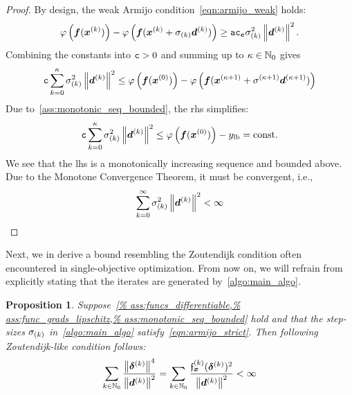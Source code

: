 \documentclass{article}
\theoremstyle{plain}
\newtheorem{proposition}[theorem]{Proposition}
\theoremstyle{definition}
\begin{document}
\begin{proof}
	By design, the weak Armijo condition~\eqref{eqn:armijo_weak} holds:
	$$
	\varphi\left(
		\bm{f}(\bm{x}^{(k)})
	\right)
	-
	\varphi\left(
		\bm{f}(\bm{x}^{(k)} + \sigma_{(k)} \bm{d}^{(k)})
	\right)
	\ge 
	\mathtt{a} \mathtt{c}_{\bm{e}} \sigma_{(k)}^2 \left\|\bm{d}^{(k)}\right\|^2 
	.
	$$
	Combining the constants into $\mathtt c >0$ and summing up to $\kappa \in \mathbb N_0$ gives 
	$$
	\mathtt c
	\sum_{k=0}^\kappa
	\sigma_{(k)}^2 \left\|\bm{d}^{(k)}\right\|^2
	\leq
	\varphi\left(
		\bm{f}(\bm{x}^{(0)})
	\right)
	-
	\varphi\left(
		\bm{f}(\bm{x}^{(\kappa + 1)} + \sigma^{(\kappa + 1)} \bm{d}^{(\kappa + 1)})
	\right)
	$$
	Due to~\cref{ass:monotonic_seq_bounded},
	the \ac{rhs} simplifies:
	$$
	\mathtt c
	\sum_{k=0}^\kappa
	\sigma_{(k)}^2 \left\|\bm{d}^{(k)}\right\|^2
	\leq
	\varphi\left(
		\bm{f}(\bm{x}^{(0)})
	\right)
	-
	{y}_{\mathrm{lb}}
	=
	\text{const}.
	$$
	We see that the \ac{lhs} is a monotonically increasing sequence and bounded above.
	Due to the Monotone Convergence Theorem, it must be convergent, i.e.,
	$$\sum_{k=0}^\infty \sigma_{(k)}^2 \left\|\bm{d}^{(k)}\right\|^2 < \infty $$
\end{proof}

Next, we in derive a bound resembling the Zoutendijk condition often encountered 
in single-objective optimization.
From now on, we will refrain from explicitly stating that the iterates are generated 
by~\cref{algo:main_algo}.
\begin{proposition}%
	\label{thm:armijoZoutendijk}
	Suppose~\cref{%
	ass:funcs_differentiable,%
	ass:func_grads_lipschitz,%
	ass:monotonic_seq_bounded}
	hold and that the step-sizes $\sigma_{(k)}$ in~\cref{algo:main_algo}
	satisfy~\cref{eqn:armijo_strict}.  
	Then following Zoutendijk-like condition follows:
	\begin{equation}
		\sum_{k \in \mathbb N_0}
		\frac{
			\left\|\bm{\delta}^{(k)}\right\|^4
		}{
			\left\|\bm{d}^{(k)}\right\|^2
		}
		=
		\sum_{k \in \mathbb N_0}
		\frac{
			\mathfrak{f}_{\bm{x}}^{(k)}(\bm{\delta}^{(k)})^2
		}{
			\left\|\bm{d}^{(k)}\right\|^2
		}
		<
		\infty
		\label{eqn:zoutendijk}
	\end{equation}
\end{proposition}
\end{document}
